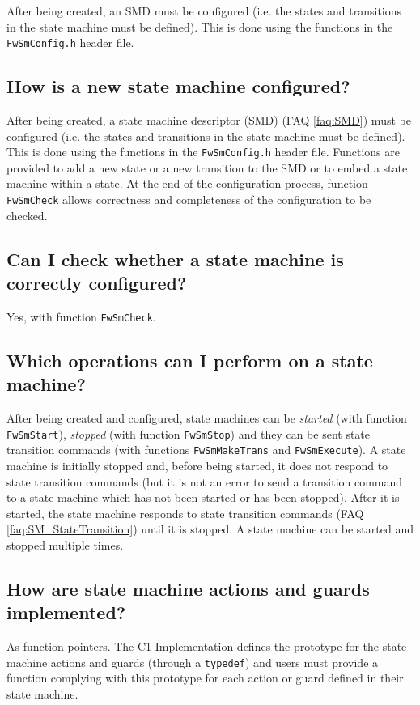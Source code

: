 \documentclass[faq]{../fwprofile}
\begin{document}
After being created, an SMD must be configured (i.e. the states and transitions in the state machine must be defined). This is done using the functions 
in the \texttt{FwSmConfig.h} header file.

\subsection{How is a new state machine configured?}
After being created, a state machine descriptor (SMD) (FAQ \ref{faq:SMD}) must be configured (i.e. the states and transitions in the state machine must be defined). 
This is done using the functions in the \texttt{FwSmConfig.h} header file. Functions are provided to add a new state or a new transition to the SMD or 
to embed a state machine within a state. At the end of the configuration process, function \texttt{FwSmCheck} allows correctness and completeness of 
the configuration to be checked.

\subsection{Can I check whether a state machine is correctly configured?}
Yes, with function \texttt{FwSmCheck}.

\subsection{Which operations can I perform on a state machine?}
After being created and configured, state machines can be \emph{started} (with function \texttt{FwSmStart}), \emph{stopped} (with function 
\texttt{FwSmStop}) and they can be sent state transition commands (with functions \texttt{FwSmMakeTrans} and \texttt{FwSmExecute}). 
A state machine is initially stopped and, before being started, 
it does not respond to state transition commands (but it is not an error to send a transition command to a state machine 
which has not been started or has been stopped). 
After it is started, the state machine responds to state transition commands (FAQ \ref{faq:SM_StateTransition}) 
until it is stopped. A state machine can be started and stopped multiple times.


\subsection{How are state machine actions and guards implemented?}
As function pointers. The C1 Implementation defines the prototype for the state machine actions and guards (through a \texttt{typedef}) and users must 
provide a function complying with this prototype for each action or guard defined in their state machine.  
\end{document}
